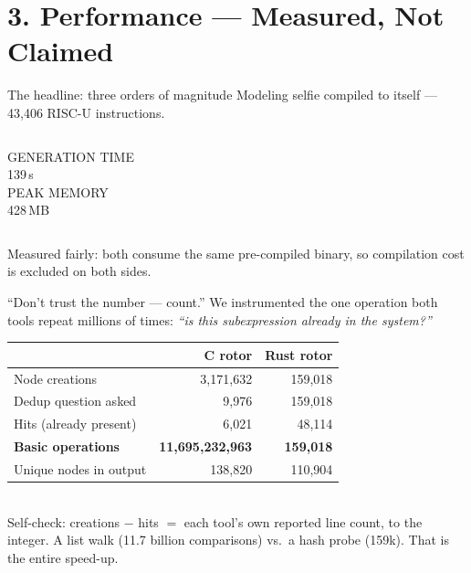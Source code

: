 \documentclass[aspectratio=169]{beamer}
\newcommand{\bignum}[2]{{\fontsize{30}{32}\selectfont\textbf{#1}}\\[2pt]{\footnotesize\color{ink!70}#2}}
\newcommand{\lab}[1]{{\footnotesize\color{ink!65}#1}}
\begin{document}
\section{3. Performance --- Measured, Not Claimed}

\begin{frame}{The headline: three orders of magnitude}
  \centering\vspace{0.3em}
  Modeling selfie compiled to itself --- 43{,}406 RISC-U instructions.
  \vfill
  \begin{columns}[c]
    \centering
      \lab{GENERATION TIME}\\[6pt]
      {\large\color{warm}139\,s}\;{\large$\rightarrow$}\;\bignum{0.1\,s}{}
    \centering
      \lab{PEAK MEMORY}\\[6pt]
      {\large\color{warm}428\,MB}\;{\large$\rightarrow$}\;\bignum{20\,MB}{}
  \end{columns}
  \vfill
  \lab{Measured fairly: both consume the same pre-compiled binary, so
       compilation cost is excluded on both sides.}
\end{frame}

\begin{frame}{``Don't trust the number --- count.''}
  We instrumented the one operation both tools repeat millions of times:
  \emph{``is this subexpression already in the system?''}
  \vspace{0.2em}
  \centering\scriptsize
  \begin{tabular}{lrr}
    \toprule
     & C rotor & Rust rotor\\
    \midrule
    Node creations             & 3{,}171{,}632                  & 159{,}018\\
    Dedup question asked        & 9{,}976                        & 159{,}018\\
    Hits (already present)      & 6{,}021                        & 48{,}114\\
    \textbf{Basic operations}   & \textbf{\color{warm}11{,}695{,}232{,}963} & \textbf{\color{accent}159{,}018}\\
    Unique nodes in output      & 138{,}820                      & 110{,}904\\
    \bottomrule
  \end{tabular}
  \vspace{0.4em}\\
  \lab{Self-check: creations $-$ hits $=$ each tool's own reported line count,
       to the integer. A list walk (11.7 billion comparisons) vs.\ a hash
       probe (159k). That is the entire speed-up.}
\end{frame}
\end{document}
